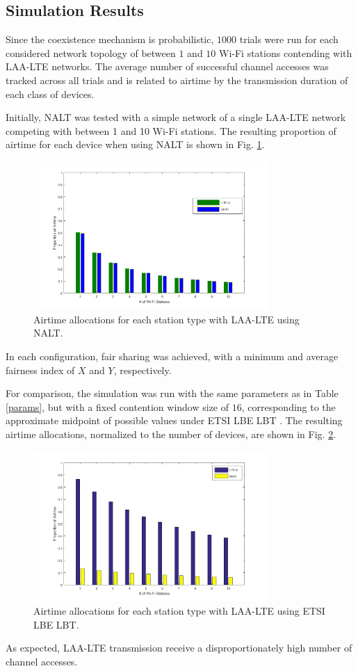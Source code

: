 \subsection{Simulation Results}%
\label{sim-results}
Since the coexistence mechanism is probabilistic, $1000$ trials were run for each considered network topology of between $1$ and $10$ \mbox{Wi-Fi} stations contending with \mbox{LAA-LTE} networks.  The average number of successful channel accesses was tracked across all trials and is related to airtime by the transmission duration of each class of devices.  

Initially, NALT was tested with a simple network of a single LAA-LTE network competing with between 1 and 10 Wi-Fi stations.  The resulting proportion of airtime for each device when using NALT is shown in Fig. \ref{basic-results}.
\begin{figure}[!ht]
	\centering
	\includegraphics[width=3.5in]{figures3/withadapt}
	\caption{Airtime allocations for each station type with LAA-LTE using NALT.}
	\label{basic-results}
\end{figure} 
In each configuration, fair sharing was achieved, with a minimum and average fairness index of $X$ and $Y$, respectively. 

For comparison, the simulation was run with the same parameters as in Table \ref{params}, but with a fixed contention window size of $16$, corresponding to the approximate midpoint of possible values under ETSI LBE LBT \cite{3gpp}. The resulting airtime allocations, normalized to the number of devices, are shown in Fig. \ref{compresults}.
\begin{figure}[!ht]
	\centering
	\includegraphics[width=3.5in]{figures3/withoutadapt}
	\caption{Airtime allocations for each station type with LAA-LTE using ETSI LBE LBT.}
	\label{compresults}
\end{figure}
As expected, LAA-LTE transmission receive a disproportionately high number of channel accesses.

